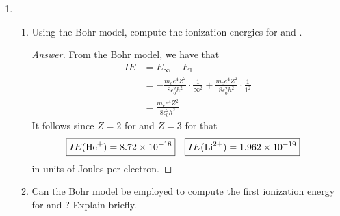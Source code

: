 \documentclass[../psets.tex]{subfiles}
\begin{document}
\begin{enumerate}
\begin{enumerate}
\begin{proof}[Answer]
            Plugging in $W=\SI{3.685e-19}{\joule}$ and $h=\SI{6.626e-34}{\joule\per\second}$, we have that
            \begin{align*}
                \Aboxed{\nu_t &= \SI{5.56e14}{\hertz}}&
                \Aboxed{\lambda_t &= \SI{5.39e-7}{\meter}}
            \end{align*}
        \end{proof}
        \item If UV light of wavelength $\lambda=\SI{3000}{\angstrom}$ is incident on the  surface, calculate the maximum kinetic energy of the electrons.
        \begin{proof}[Answer]
            From Einstein's annus mirabilis papers, we have that
            \begin{align*}
                KE_\text{max} &= h\nu-W\\
                &= \frac{hc}{\lambda}-W\\
                \Aboxed{KE_\text{max} &= \SI{2.941e-19}{\joule}}
            \end{align*}
        \end{proof}
    \end{enumerate}
    \item 
    \begin{enumerate}
        \item Using the Bohr model, compute the ionization energies for  and .
        \begin{proof}[Answer]
            From the Bohr model, we have that
            \begin{align*}
                IE &= E_\infty-E_1\\
                &= -\frac{m_ee^4Z^2}{8\epsilon_0^2h^2}\cdot\frac{1}{\infty^2}+\frac{m_ee^4Z^2}{8\epsilon_0^2h^2}\cdot\frac{1}{1^2}\\
                &= \frac{m_ee^4Z^2}{8\epsilon_0^2h^2}
            \end{align*}
            It follows since $Z=2$ for  and $Z=3$ for  that
            \begin{align*}
                \Aboxed{IE(\ce{He+}) &= \num{8.72e-18}}&
                \Aboxed{IE(\ce{Li^2+}) &= \num{1.962e-19}}
            \end{align*}
            in units of Joules per electron.
        \end{proof}
        \item Can the Bohr model be employed to compute the first ionization energy for  and ? Explain briefly.

\end{enumerate}
\end{enumerate}
\end{document}
